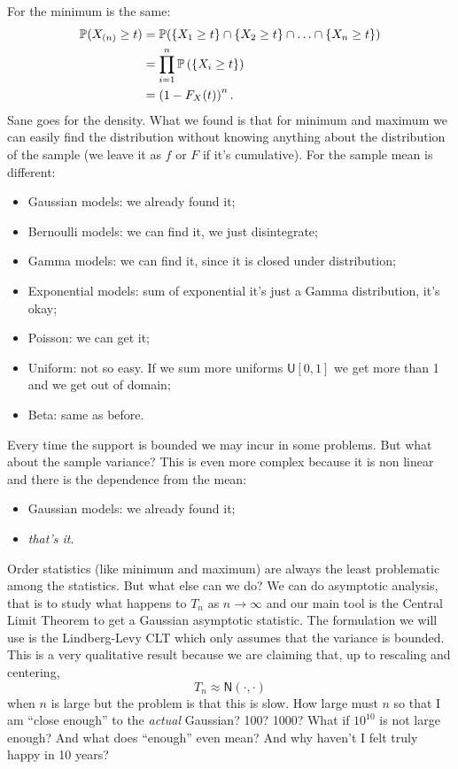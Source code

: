 \documentclass[12pt]{report}
\begin{document}
For the minimum is the same:
\begin{align*}
	\mathbb{P}(X_{(n)}\geq t)&=\mathbb{P}(\left\{X_{1}\geq t\right\}\cap\left\{X_{2}\geq t\right\}\cap\ldots\cap\left\{X_{n}\geq t\right\})\\
	&=\prod_{i=1}^{n}\mathbb{P}\left(\left\{X_{i}\geq t\right\}\right)\\
	&=\left(1-F_{X}(t)\right)^{n}.
\end{align*}
Sane goes for the density. What we found is that for minimum and maximum we can easily find the distribution without knowing anything about the distribution of the sample (we leave it as $f$ or $F$ if it's cumulative). For the sample mean is different:
\begin{itemize}
	\item Gaussian models: we already found it;
	\item Bernoulli models: we can find it, we just disintegrate;
	\item Gamma models: we can find it, since it is closed under distribution;
	\item Exponential models: sum of exponential it's just a Gamma distribution, it's okay;
	\item Poisson: we can get it;
	\item Uniform: not so easy. If we sum more uniforms $\mathsf{U}[0,1]$ we get more than 1 and we get out of domain;
	\item Beta: same as before.
\end{itemize}
Every time the support is bounded we may incur in some problems. But what about the sample variance? This is even more complex because it is non linear and there is the dependence from the mean:
\begin{itemize}
	\item Gaussian models: we already found it;
	\item \textit{that's it}.
\end{itemize}
Order statistics (like minimum and maximum) are always the least problematic among the statistics. But what else can we do? We can do asymptotic analysis, that is to study what happens to $T_{n}$ as $n\to\infty$ and our main tool is the Central Limit Theorem to get a Gaussian asymptotic statistic. The formulation we will use is the Lindberg-Levy CLT which only assumes that the variance is bounded. This is a very qualitative result because we are claiming that, up to rescaling and centering, \begin{equation*}
	T_{n}\approx\mathsf{N}(\cdot,\cdot)
\end{equation*} when $n$ is large but the problem is that this is slow. How large must $n$ so that I am ``close enough'' to the \textit{actual} Gaussian? 100? 1000? What if $10^{10}$ is not large enough? And what does ``enough'' even mean? And why haven't I felt truly happy in 10 years?\par
\end{document}
